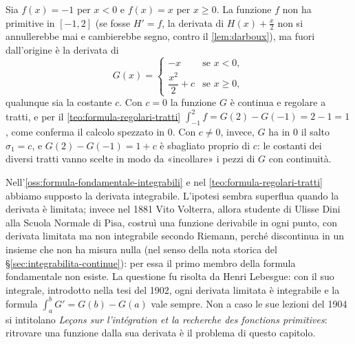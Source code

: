 \begin{esempio}\label{es:integranda-salto}
Sia $f(x)=-1$ per $x<0$ e $f(x)=x$ per $x\ge0$. La funzione $f$ non ha primitive in
$[-1,2]$ (se fosse $H'=f$, la derivata di $H(x)+\frac x2$ non si annullerebbe mai e
cambierebbe segno, contro il \cref{lem:darboux}), ma fuori dall'origine è la derivata di
\[
  G(x)=\begin{cases} -x & \text{se } x<0,\\[2pt] \dfrac{x^{2}}2+c & \text{se } x\ge0, \end{cases}
\]
qualunque sia la costante $c$. Con $c=0$ la funzione $G$ è continua e regolare a tratti, e
per il \cref{teo:formula-regolari-tratti} $\int_{-1}^{2}f=G(2)-G(-1)=2-1=1$, come conferma
il calcolo spezzato in $0$. Con $c\neq0$, invece, $G$ ha in $0$ il salto $\sigma_{1}=c$, e
$G(2)-G(-1)=1+c$ è sbagliato proprio di $c$: le costanti dei diversi tratti vanno scelte
in modo da «incollare» i pezzi di $G$ con continuità.
\end{esempio}

\begin{notastorica}
Nell'\cref{oss:formula-fondamentale-integrabili} e nel \cref{teo:formula-regolari-tratti}
abbiamo supposto la derivata integrabile. L'ipotesi sembra superflua quando la derivata è
limitata; invece nel 1881 Vito Volterra, allora studente di Ulisse Dini alla Scuola
Normale di Pisa, costruì una funzione derivabile in ogni punto, con derivata limitata ma
non integrabile secondo Riemann, perché discontinua in un insieme che non ha misura
nulla (nel senso della nota storica del \S\ref{sec:integrabilita-continue}): per essa il
primo membro della formula fondamentale non esiste. La questione fu risolta da Henri
Lebesgue: con il suo integrale, introdotto nella tesi del 1902, ogni derivata limitata è
integrabile e la formula $\int_{a}^{b}G'=G(b)-G(a)$ vale sempre. Non a caso le sue lezioni
del 1904 si intitolano \emph{Leçons sur l'intégration et la recherche des fonctions
primitives}: ritrovare una funzione dalla sua derivata è il problema di questo capitolo.
\end{notastorica}
